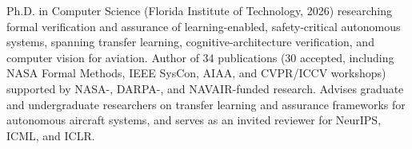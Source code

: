


\begin{cvparagraph}
Ph.D. in Computer Science (Florida Institute of Technology, 2026) researching formal verification and assurance of learning-enabled, safety-critical autonomous systems, spanning transfer learning, cognitive-architecture verification, and computer vision for aviation. Author of 34 publications (30 accepted, including NASA Formal Methods, IEEE SysCon, AIAA, and CVPR/ICCV workshops) supported by NASA-, DARPA-, and NAVAIR-funded research. Advises graduate and undergraduate researchers on transfer learning and assurance frameworks for autonomous aircraft systems, and serves as an invited reviewer for NeurIPS, ICML, and ICLR.
\end{cvparagraph}
